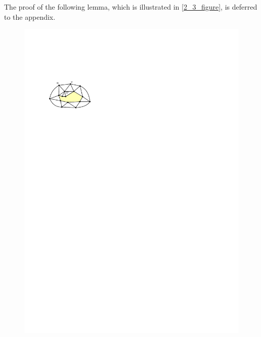 \documentclass[a4paper,UKenglish,cleveref, autoref, thm-restate]{lipics-v2021}
\begin{document}

The proof of the following lemma, which is illustrated in \cref{2_3_figure}, is deferred to the appendix.

\begin{figure}
  \centering
  \includegraphics[page=1]{figs/2_3_figure}

\end{figure}
\end{document}
